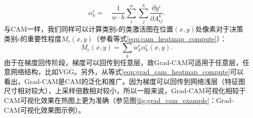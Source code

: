 \begin{equation}
\alpha_{k}^{c}=\quad \frac{1}{w·h} \sum_{i}^{w} \sum_{j}^{h} \frac{\partial y^{c}}{\partial A_{i j}^{k}}.
\end{equation}
与CAM一样，我们同样可以计算类别$c$的类激活图在位置$(x,y)$处像素对于决策类别$c$的重要性程度$M_c(x, y)$（参看等式\ref{equ:cam_heatmap_compute}）：
\begin{equation}\label{equ:grad_cam_heatmap_compute}
M_{c}(x, y)=\sum_{k} w_{k}^{c} \alpha_{k}^c(x, y).
\end{equation}
由于在梯度回传阶段，梯度可以回传到任意层，故Grad-CAM可适用于任意层，任意网络结构，比如VGG。另外，从等式\ref{equ:grad_cam_heatmap_compute}可以看出，Grad-CAM是CAM的泛化和推广。因为梯度可以回传到网络浅层（特征图尺寸相对较大），上采样倍数相对较小，所以一般来说，Grad-CAM可视化相较于CAM可视化效果在热图上更为准确（参见图\ref{fig:grad_cam_example}：Grad-CAM可视化效果图示例）。
